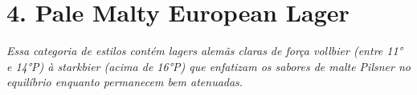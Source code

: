 \section*{4. Pale Malty European Lager}
\textit{Essa categoria de estilos contém lagers alemãs claras de força vollbier (entre 11° e 14°P) à starkbier (acima de 16°P) que enfatizam os sabores de malte Pilsner no equilíbrio enquanto permanecem bem atenuadas.}
